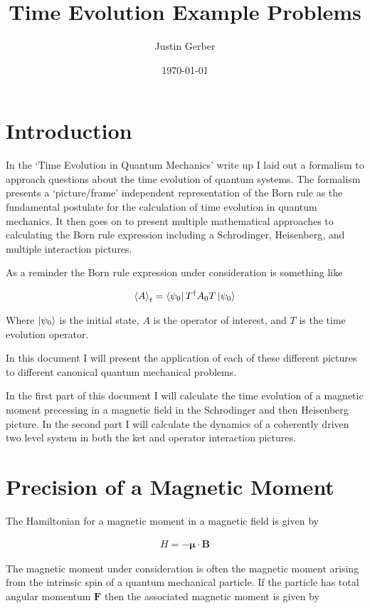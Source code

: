 \documentclass[12pt]{article}
\newcommand{\bv}[1]{\boldsymbol{#1}}
\begin{document}
\title{Time Evolution Example Problems}
\author{Justin Gerber}
\date{\today}
\maketitle

\section{Introduction}

In the `Time Evolution in Quantum Mechanics' write up I laid out a formalism to approach questions about the time evolution of quantum systems.
The formalism presents a `picture/frame' independent representation of the Born rule as the fundamental postulate for the calculation of time evolution in quantum mechanics.
It then goes on to present multiple mathematical approaches to calculating the Born rule expression including a Schrodinger, Heisenberg, and multiple interaction pictures.

As a reminder the Born rule expression under consideration is something like

\begin{align}
\braket{A}_t = \bra{\psi_0}T^{\dag} A_0 T\ket{\psi_0}
\end{align}

Where $\ket{\psi_0}$ is the initial state, $A$ is the operator of interest, and $T$ is the time evolution operator.

In this document I will present the application of each of these different pictures to different canonical quantum mechanical problems.

In the first part of this document I will calculate the time evolution of a magnetic moment precessing in a magnetic field in the Schrodinger and then Heisenberg picture.
In the second part I will calculate the dynamics of a coherently driven two level system in both the ket and operator interaction pictures.

\section{Precision of a Magnetic Moment}

The Hamiltonian for a magnetic moment in a magnetic field is given by

\begin{align}
H = -\bv{\mu}\cdot\bv{B}
\end{align}

The magnetic moment under consideration is often the magnetic moment arising from the intrinsic spin of a quantum mechanical particle.
If the particle has total angular momentum $\bv{F}$ then the associated magnetic moment is given by
\end{document}
